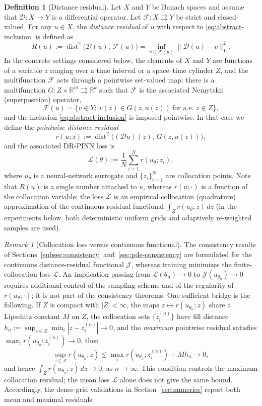 \documentclass[11pt]{elsarticle}
\theoremstyle{definition}
\newtheorem{definition}[theorem]{Definition}
\theoremstyle{remark}
\newtheorem{remark}[theorem]{Remark}
\numberwithin{equation}{section}
\def\dist{\operatorname{dist}}
\begin{document}
	\begin{definition}[Distance residual]
		Let $X$ and $Y$ be Banach spaces and assume that $\mathcal{D}:X\to Y$ is a differential operator. Let $\mathcal{F}:X\rightrightarrows Y$ be strict and
		closed-valued.
		For any $u\in X$, the \emph{distance residual} of $u$ with respect to
		\eqref{eq:abstract-inclusion} is defined as
		\[
		R(u):=\dist^2\bigl(\mathcal{D}(u),\,\mathcal{F}(u)\bigr)
		= \inf_{v\in \mathcal{F}(u)} \|\mathcal{D}(u) - v \|_Y^2.
		\]
		In the concrete settings considered below, the elements of $X$ and
		$Y$ are functions of a variable $z$ ranging over a time interval or a
		space--time cylinder $Z$, and the multifunction $\mathcal{F}$ acts
		through a pointwise set-valued map: there is a multifunction
		$G:Z\times\mathbb{R}^m\rightrightarrows\mathbb{R}^k$ such that
		$\mathcal{F}$ is the associated Nemytskii (superposition) operator,
		\[
		\mathcal{F}(u)
		=
		\bigl\{v\in Y:\ v(z)\in G(z,u(z))\ \text{for a.e. } z\in Z\bigr\},
		\]
		and the inclusion \eqref{eq:abstract-inclusion} is imposed pointwise.
		In that case we define the \emph{pointwise distance residual}
		\[
		r(u;z)
		:=
		\dist^2\bigl((\mathcal{D}u)(z),\,G(z,u(z))\bigr),
		\]
		and the associated DR-PINN loss is
		\[
		\mathcal{L}(\theta)
		:=
		\frac{1}{N}\sum_{i=1}^{N} r(u_\theta;z_i),
		\]
		where $u_\theta$ is a neural-network surrogate and $\{z_i\}_{i=1}^N$ are
		collocation points. Note that $R(u)$ is a single number attached to $u$,
		whereas $r(u;\cdot)$ is a function of the collocation variable; the loss
		$\mathcal{L}$ is an empirical collocation (quadrature) approximation of
		the continuous residual functional $\int_Z r(u_\theta;z)\,dz$
		(in the experiments below, both deterministic uniform grids and
		adaptively re-weighted samples are used).
	\end{definition}

	\begin{remark}[Collocation loss versus continuous functional]
		\label{rem:collocation-gap}
		The consistency results of
		Sections~\ref{subsec:consistency} and~\ref{sec:pde-consistency} are
		formulated for the continuous distance-residual functional
		$\mathcal{J}$, whereas training minimizes the finite-collocation loss
		$\mathcal{L}$. An implication
		passing from $\mathcal{L}(\theta_n)\to0$ to
		$\mathcal{J}(u_{\theta_n})\to0$ requires additional control of the
		sampling scheme and of the regularity of $r(u_\theta;\cdot)$; it is not
		part of the consistency theorems. One sufficient bridge is the
		following. If $Z$ is compact with $|Z|<\infty$, the maps
		$z\mapsto r(u_{\theta_n};z)$ share a Lipschitz constant $M$ on $Z$,
		the collocation sets $\{z_i^{(n)}\}$ have fill distance
		$h_n:=\sup_{z\in Z}\min_i|z-z_i^{(n)}|\to0$, and the
		\emph{maximum} pointwise residual satisfies
		$\max_i r(u_{\theta_n};z_i^{(n)})\to0$, then
		\[
		\sup_{z\in Z}r(u_{\theta_n};z)
		\le\max_i r(u_{\theta_n};z_i^{(n)})+Mh_n\longrightarrow0,
		\]
		and hence $\int_Z r(u_{\theta_n};z)\,dz\to0$, as $n\to\infty$. This condition controls
		the maximum collocation residual; the mean loss $\mathcal{L}$ alone does
		not give the same bound. Accordingly, the dense-grid validations in
		Section~\ref{sec:numerics} report both mean and maximal residuals.
	\end{remark}
	
\end{document}
